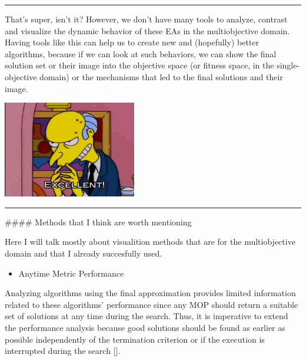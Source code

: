\documentclass[
]{article}
\providecommand{\tightlist}{%
  \setlength{\itemsep}{0pt}\setlength{\parskip}{0pt}}
\begin{document}
\begin{center}\rule{0.5\linewidth}{0.5pt}\end{center}

That's super, isn't it? However, we don't have many tools to analyze,
contrast and visualize the dynamic behavior of these EAs in the
multiobjective domain. Having tools like this can help us to create new
and (hopefully) better algorithms, because if we can look at such
behaviors, we can show the final solution set or their image into the
objective space (or fitness space, in the single-objective domain) or
the mechanisms that led to the final solutions and their image.

\begin{center}\includegraphics{gifs/thats_good} \end{center}

\begin{center}\rule{0.5\linewidth}{0.5pt}\end{center}

\#\#\#\# Methods that I think are worth mentioning

Here I will talk mostly about visualition methods that are for the
multiobjective domain and that I already succesfully used.

\begin{itemize}
\tightlist
\item
  Anytime Metric Performance
\end{itemize}

Analyzing algorithms using the final approximation provides limited
information related to these algorithms' performance since any MOP
should return a suitable set of solutions at any time during the search.
Thus, it is imperative to extend the performance analysis because good
solutions should be found as earlier as possible independently of the
termination criterion or if the execution is interrupted during the
search {[}{]}.
\end{document}
